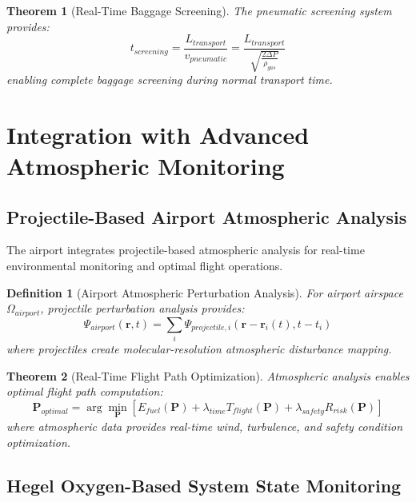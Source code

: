 \documentclass[12pt,a4paper]{article}
\newtheorem{theorem}{Theorem}
\newtheorem{definition}{Definition}
\begin{document}
\begin{theorem}[Real-Time Baggage Screening]
The pneumatic screening system provides:
\begin{equation}
t_{screening} = \frac{L_{transport}}{v_{pneumatic}} = \frac{L_{transport}}{\sqrt{\frac{2\Delta P}{\rho_{gas}}}}
\end{equation}
enabling complete baggage screening during normal transport time.
\end{theorem}

\section{Integration with Advanced Atmospheric Monitoring}

\subsection{Projectile-Based Airport Atmospheric Analysis}

The airport integrates projectile-based atmospheric analysis for real-time environmental monitoring and optimal flight operations.

\begin{definition}[Airport Atmospheric Perturbation Analysis]
For airport airspace $\Omega_{airport}$, projectile perturbation analysis provides:
\begin{equation}
\Psi_{airport}(\mathbf{r},t) = \sum_{i} \Psi_{projectile,i}(\mathbf{r} - \mathbf{r}_i(t), t - t_i)
\end{equation}
where projectiles create molecular-resolution atmospheric disturbance mapping.
\end{definition}

\begin{theorem}[Real-Time Flight Path Optimization]
Atmospheric analysis enables optimal flight path computation:
\begin{equation}
\mathbf{P}_{optimal} = \arg\min_{\mathbf{P}} \left[ E_{fuel}(\mathbf{P}) + \lambda_{time} T_{flight}(\mathbf{P}) + \lambda_{safety} R_{risk}(\mathbf{P}) \right]
\end{equation}
where atmospheric data provides real-time wind, turbulence, and safety condition optimization.
\end{theorem}

\subsection{Hegel Oxygen-Based System State Monitoring}
\end{document}
